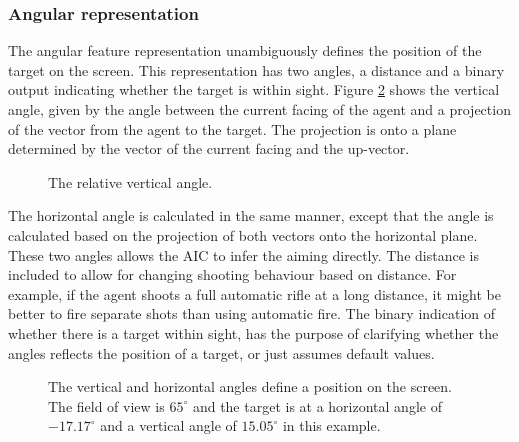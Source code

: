 \subsubsection{Angular representation}
\label{sec:angular}
The angular feature representation unambiguously defines the position of the target on the screen. This representation has two angles, a distance and a binary output indicating whether the target is within sight. Figure \ref{fig:angular} shows the vertical angle, given by the angle between the current facing of the agent and a projection of the vector from the agent to the target. The projection is onto a plane determined by the vector of the current facing and the up-vector.
\begin{figure}[H]
    \centering
    	\begin{scriptsize}
		\sffamily
    	
    	\end{scriptsize}
    \caption[Calculation of angles]{The relative vertical angle.}
    \label{fig:angular}
\end{figure}
\noindent
The horizontal angle is calculated in the same manner, except that the angle is calculated based on the projection of both vectors onto the horizontal plane. These two angles allows the AIC to infer the aiming directly. The distance is included to allow for changing shooting behaviour based on distance. For example, if the agent shoots a full automatic rifle at a long distance, it might be better to fire separate shots than using automatic fire. The binary indication of whether there is a target within sight, has the purpose of clarifying whether the angles reflects the position of a target, or just assumes default values.
\begin{figure}[H]
    \centering
    	\begin{scriptsize}
		\sffamily
    	
    	\end{scriptsize}
    \caption[Angular representation of the visual state]{The vertical and horizontal angles define a position on the screen. The field of view is $65^\circ$ and the target is at a horizontal angle of $-17.17^\circ$ and a vertical angle of $15.05^\circ$ in this example.}
    \label{fig:angular}
\end{figure}

